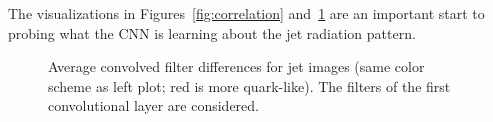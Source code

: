 The visualizations in Figures~\ref{fig:correlation} and~\ref{fig:filters} are an important start to probing 
what the CNN is learning about the jet radiation pattern.  
 
\begin{figure}[htbp]
\begin{center}
\caption{
Average convolved filter differences for jet images (same color scheme as left plot; red is more quark-like). 
The filters of the first convolutional layer are considered.}
\label{fig:filters}
\end{center}
\end{figure}
